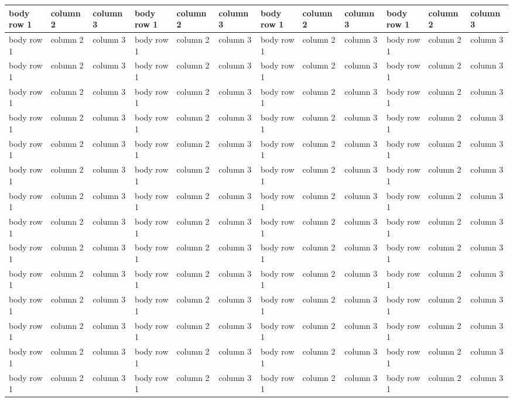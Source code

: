 \documentclass[a4paper,11pt,french]{rtdsphinxmanual}
\begin{document}
\begin{longtable}{|l|l|l|l|l|l|l|l|l|l|l|l|}
\hline
body row 1
 & 
column 2
 & 
column 3
 & 
body row 1
 & 
column 2
 & 
column 3
 & 
body row 1
 & 
column 2
 & 
column 3
 & 
body row 1
 & 
column 2
 & 
column 3
\\
\hline
body row 1
 & 
column 2
 & 
column 3
 & 
body row 1
 & 
column 2
 & 
column 3
 & 
body row 1
 & 
column 2
 & 
column 3
 & 
body row 1
 & 
column 2
 & 
column 3
\\
\hline
body row 1
 & 
column 2
 & 
column 3
 & 
body row 1
 & 
column 2
 & 
column 3
 & 
body row 1
 & 
column 2
 & 
column 3
 & 
body row 1
 & 
column 2
 & 
column 3
\\
\hline
body row 1
 & 
column 2
 & 
column 3
 & 
body row 1
 & 
column 2
 & 
column 3
 & 
body row 1
 & 
column 2
 & 
column 3
 & 
body row 1
 & 
column 2
 & 
column 3
\\
\hline
body row 1
 & 
column 2
 & 
column 3
 & 
body row 1
 & 
column 2
 & 
column 3
 & 
body row 1
 & 
column 2
 & 
column 3
 & 
body row 1
 & 
column 2
 & 
column 3
\\
\hline
body row 1
 & 
column 2
 & 
column 3
 & 
body row 1
 & 
column 2
 & 
column 3
 & 
body row 1
 & 
column 2
 & 
column 3
 & 
body row 1
 & 
column 2
 & 
column 3
\\
\hline
body row 1
 & 
column 2
 & 
column 3
 & 
body row 1
 & 
column 2
 & 
column 3
 & 
body row 1
 & 
column 2
 & 
column 3
 & 
body row 1
 & 
column 2
 & 
column 3
\\
\hline
body row 1
 & 
column 2
 & 
column 3
 & 
body row 1
 & 
column 2
 & 
column 3
 & 
body row 1
 & 
column 2
 & 
column 3
 & 
body row 1
 & 
column 2
 & 
column 3
\\
\hline
body row 1
 & 
column 2
 & 
column 3
 & 
body row 1
 & 
column 2
 & 
column 3
 & 
body row 1
 & 
column 2
 & 
column 3
 & 
body row 1
 & 
column 2
 & 
column 3
\\
\hline
body row 1
 & 
column 2
 & 
column 3
 & 
body row 1
 & 
column 2
 & 
column 3
 & 
body row 1
 & 
column 2
 & 
column 3
 & 
body row 1
 & 
column 2
 & 
column 3
\\
\hline
body row 1
 & 
column 2
 & 
column 3
 & 
body row 1
 & 
column 2
 & 
column 3
 & 
body row 1
 & 
column 2
 & 
column 3
 & 
body row 1
 & 
column 2
 & 
column 3
\\
\hline
body row 1
 & 
column 2
 & 
column 3
 & 
body row 1
 & 
column 2
 & 
column 3
 & 
body row 1
 & 
column 2
 & 
column 3
 & 
body row 1
 & 
column 2
 & 
column 3
\\
\hline
body row 1
 & 
column 2
 & 
column 3
 & 
body row 1
 & 
column 2
 & 
column 3
 & 
body row 1
 & 
column 2
 & 
column 3
 & 
body row 1
 & 
column 2
 & 
column 3
\\
\hline
body row 1
 & 
column 2
 & 
column 3
 & 
body row 1
 & 
column 2
 & 
column 3
 & 
body row 1
 & 
column 2
 & 
column 3
 & 
body row 1
 & 
column 2
 & 
column 3
\\
\hline
body row 1
 & 
column 2
 & 
column 3
 & 
body row 1
 & 
column 2
 & 
column 3
 & 
body row 1
 & 
column 2
 & 
column 3
 & 
body row 1
 & 
column 2
 & 
column 3
\\
\hline\end{longtable}
\end{document}
